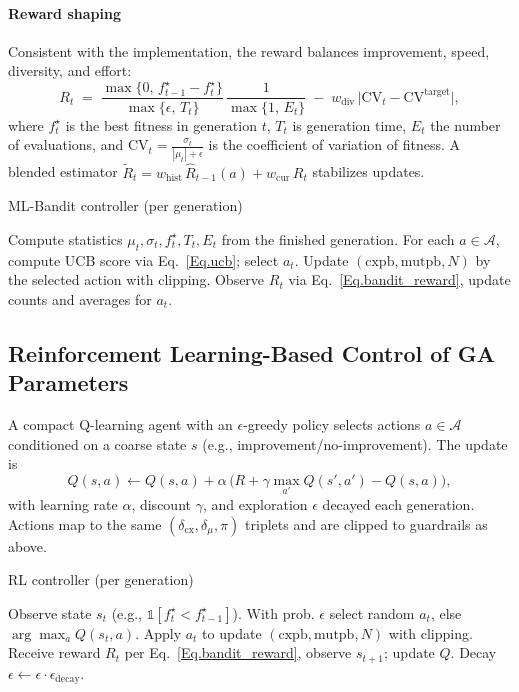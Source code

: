 \documentclass[12pt,a4paper]{article}
\begin{document}
    \paragraph{Reward shaping}
    Consistent with the implementation, the reward balances improvement, speed, diversity, and effort:
    \begin{equation}\label{Eq.bandit_reward}
        R_t\;=\;\frac{\max\{0,\,f^{\star}_{t-1}-f^{\star}_{t}\}}{\max\{\epsilon,\,T_t\}}\,\frac{1}{\max\{1,\,E_t\}}\; -\; w_{\text{div}}\,\big|\mathrm{CV}_t-\mathrm{CV}^{\text{target}}\big|,
    \end{equation}
    where $f^{\star}_t$ is the best fitness in generation $t$, $T_t$ is generation time, $E_t$ the number of evaluations, and $\mathrm{CV}_t=\tfrac{\sigma_t}{|\mu_t|+\epsilon}$ is the coefficient of variation of fitness. A blended estimator $\tilde R_t= w_{\text{hist}}\,\hat{R}_{t-1}(a)+w_{\text{cur}}\,R_t$ stabilizes updates.

    \begin{algorithm}[H]
    \caption{ML-Bandit controller (per generation)}
    \begin{algorithmic}[1]
    \STATE Compute statistics $\mu_t,\sigma_t,f^{\star}_t,T_t,E_t$ from the finished generation.
    \STATE For each $a\in\mathcal{A}$, compute UCB score via Eq.~\eqref{Eq.ucb}; select $a_t$.
    \STATE Update $(\text{cxpb},\text{mutpb},N)$ by the selected action with clipping.
    \STATE Observe $R_t$ via Eq.~\eqref{Eq.bandit_reward}, update counts and averages for $a_t$.
    \end{algorithmic}
    \end{algorithm}

    \subsection{Reinforcement Learning-Based Control of GA Parameters}
    A compact Q-learning agent with an $\epsilon$-greedy policy selects actions $a\in\mathcal{A}$ conditioned on a coarse state $s$ (e.g., improvement/no-improvement). The update is
    \begin{equation}
        Q(s,a)\leftarrow Q(s,a)+\alpha\,\big(R+\gamma\max_{a'}Q(s',a')-Q(s,a)\big),
    \end{equation}
    with learning rate $\alpha$, discount $\gamma$, and exploration $\epsilon$ decayed each generation. Actions map to the same $(\delta_{\text{cx}},\delta_{\mu},\pi)$ triplets and are clipped to guardrails as above.

    \begin{algorithm}[H]
    \caption{RL controller (per generation)}
    \begin{algorithmic}[1]
    \STATE Observe state $s_t$ (e.g., $\mathbb{1}[f^{\star}_t<f^{\star}_{t-1}]$).
    \STATE With prob. $\epsilon$ select random $a_t$, else $\arg\max_a Q(s_t,a)$.
    \STATE Apply $a_t$ to update $(\text{cxpb},\text{mutpb},N)$ with clipping.
    \STATE Receive reward $R_t$ per Eq.~\eqref{Eq.bandit_reward}, observe $s_{t+1}$; update $Q$.
    \STATE Decay $\epsilon\leftarrow\epsilon\cdot\epsilon_{\text{decay}}$.
    \end{algorithmic}
    \end{algorithm}
\end{document}

